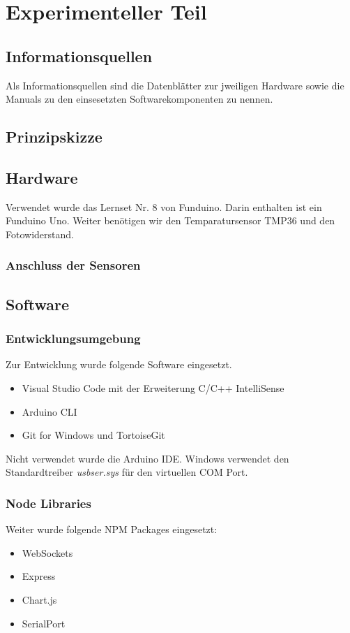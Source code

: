 \section{Experimenteller Teil}

\subsection{Informationsquellen}
Als Informationsquellen sind die Datenblätter zur jweiligen Hardware sowie die Manuals zu den einsesetzten Softwarekomponenten zu nennen.

\subsection{Prinzipskizze}

\subsection{Hardware}
Verwendet wurde das Lernset Nr. 8 von Funduino\cite{lernset}. Darin enthalten ist ein Funduino Uno. Weiter benötigen wir den Temparatursensor TMP36 und den Fotowiderstand.

\subsubsection{Anschluss der Sensoren}

\subsection{Software}

\subsubsection{Entwicklungsumgebung}
Zur Entwicklung wurde folgende Software eingesetzt.
\begin{itemize}
    \item Visual Studio Code\cite{vscode} mit der Erweiterung C/C++ IntelliSense\cite{intellisense}
    \item Arduino CLI\cite{arduinoCli}
    \item Git for Windows\cite{gitForWindows} und TortoiseGit\cite{tortoiseGit} 
  \end{itemize}
Nicht verwendet wurde die Arduino IDE. Windows verwendet den Standardtreiber \textit {usbser.sys} für den virtuellen COM Port. 

\subsubsection{Node Libraries}
Weiter wurde folgende NPM Packages eingesetzt:
\begin{itemize}
  \item WebSockets \cite{websockets}
  \item Express \cite{express}
  \item Chart.js \cite{chartjs}
  \item SerialPort \cite{serialPort}
\end{itemize}

